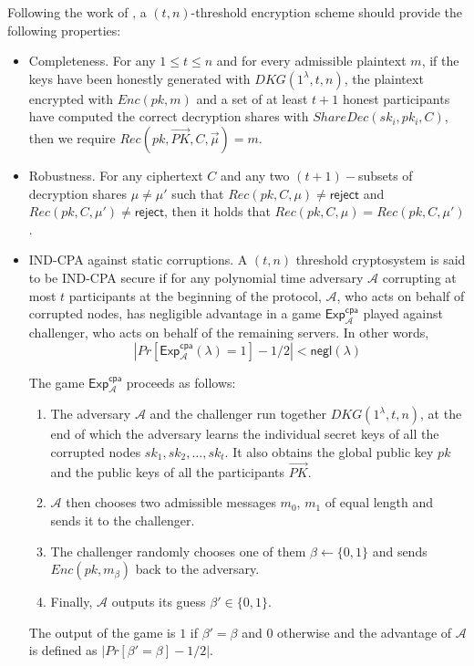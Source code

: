 \documentclass[letterpaper,twocolumn,10pt]{article}
\theoremstyle{definition}
\theoremstyle{remark}
\begin{document}
Following the work of \cite{cortier2013distributed}, a $(t, n)$-threshold encryption scheme should provide the following properties:
\begin{itemize}
    \item Completeness. For any $1\le t\le n$ and for every admissible plaintext $m$, if the keys have been honestly generated with $DKG(1^\lambda, t, n)$, the plaintext encrypted with $Enc(pk, m)$ and a set of at least $t+1$ honest participants have computed the correct decryption shares with $ShareDec(sk_i, pk_i, C)$, then we require $Rec(pk, \vec{PK}, C, \vec{\mu} ) = m$.
    \item Robustness. For any ciphertext $C$ and any two $(t+1)-$subsets of decryption shares $\mu \ne \mu'$ such that $Rec(pk, C, \mu) \ne \mathsf{reject}$ and $Rec(pk, C, \mu') \ne \mathsf{reject}$, then it holds that $Rec(pk, C, \mu) = Rec(pk, C, \mu')$.
    \item IND-CPA against static corruptions. A $(t, n)$ threshold cryptosystem is said to be IND-CPA secure if for any polynomial time adversary $\mathcal{A}$ corrupting at most $t$ participants at the beginning of the protocol, $\mathcal{A}$, who acts on behalf of corrupted nodes, has negligible advantage in a  game $\mathsf{Exp}^{\mathsf{cpa}}_{\mathcal{A}}$ played against challenger, who acts on behalf of the remaining servers. In other words,
    $$|Pr[\mathsf{Exp}_{\mathcal{A}}^{\mathsf{cpa}}(\lambda) = 1] - 1/2| < \mathsf{negl}(\lambda)$$
    
    The game $\mathsf{Exp}^{\mathsf{cpa}}_{\mathcal{A}}$ proceeds as follows:
    \begin{enumerate}
        \item The adversary $\mathcal{A}$ and the challenger run together $DKG(1^\lambda, t, n)$, at the end of which the adversary learns the individual secret keys of all the corrupted nodes $sk_1, sk_2, \ldots, sk_t$. It also obtains the global public key $pk$ and the public keys of all the participants $\vec{PK}$.
        \item $\mathcal{A}$ then chooses two admissible messages $m_0$, $m_1$ of equal length and sends it to the challenger.
        \item The challenger randomly chooses one of them $\beta \leftarrow \{0, 1\}$ and sends $Enc(pk, m_{\beta})$ back to the adversary.
        \item Finally, $\mathcal{A}$ outputs its guess $\beta' \in \{0,1\}$.
    \end{enumerate}
    The output of the game is $1$ if $\beta' = \beta$ and $0$ otherwise and the advantage of $\mathcal{A}$ is defined as $|Pr[\beta' = \beta] - 1/2|$.
\end{itemize}
\end{document}
